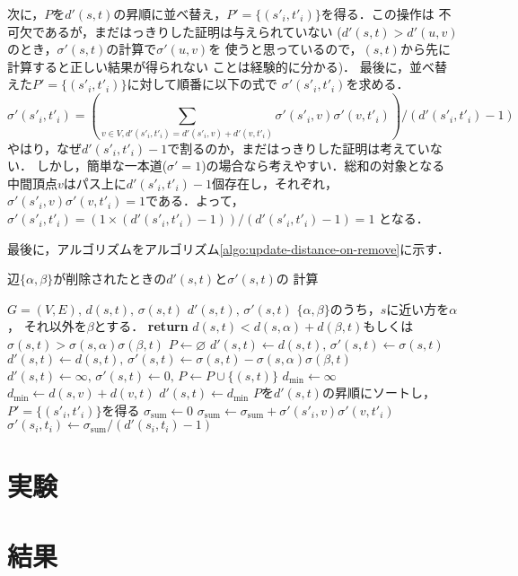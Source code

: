 次に，$P$を$d'(s,t)$の昇順に並べ替え，$P'=\{(s'_i,t'_i)\}$を得る．この操作は
不可欠であるが，まだはっきりした証明は与えられていない
($d'(s,t)>d'(u,v)$のとき，$\sigma'(s,t)$の計算で$\sigma'(u,v)$を
使うと思っているので，$(s,t)$から先に計算すると正しい結果が得られない
ことは経験的に分かる)．
最後に，並べ替えた$P'=\{(s'_i,t'_i)\}$に対して順番に以下の式で
$\sigma'(s'_i,t'_i)$を求める．
\[ \sigma'(s'_i,t'_i)=\left(\sum_{v\in V,d'(s'_i,t'_i)=d'(s'_i,v)+d'(v,t'_i)}
\sigma'(s'_i,v)\sigma'(v,t'_i)\right) / (d'(s'_i,t'_i)-1) \]
やはり，なぜ$d'(s'_i,t'_i)-1$で割るのか，まだはっきりした証明は考えていない．
しかし，簡単な一本道($\sigma'=1$)の場合なら考えやすい．総和の対象となる
中間頂点$v$はパス上に$d'(s'_i,t'_i)-1$個存在し，それぞれ，
$\sigma'(s'_i,v)\sigma'(v,t'_i)=1$である．よって，
$\sigma'(s'_i,t'_i)=(1\times (d'(s'_i,t'_i)-1))/(d'(s'_i,t'_i)-1)=1$
となる．

最後に，アルゴリズムをアルゴリズム\ref{algo:update-distance-on-remove}に示す．
\begin{algorithm}
  \caption{辺$\{\alpha,\beta\}$が削除されたときの$d'(s,t)$と$\sigma'(s,t)$の
  計算}\label{algo:update-distance-on-remove}
  \begin{algorithmic}[1]
    \Require $G=(V,E),\,d(s,t),\,\sigma(s,t)$
    \Ensure $d'(s,t),\,\sigma'(s,t)$
    \State $\{\alpha,\beta\}$のうち，$s$に近い方を$\alpha$，
    それ以外を$\beta$とする．
    \State \textbf{return} $d(s,t)<d(s,\alpha)+d(\beta,t)$もしくは
    $\sigma(s,t)>\sigma(s,\alpha)\sigma(\beta,t)$
    \EndProcedure
    \State $P\gets\varnothing$
    \State $d'(s,t)\gets d(s,t),\,\sigma'(s,t)\gets\sigma(s,t)$
    \State $d'(s,t)\gets d(s,t),\,\sigma'(s,t)\gets\sigma(s,t)
    -\sigma(s,\alpha)\sigma(\beta,t)$
    \Else{}
    \State $d'(s,t)\gets\infty,\,\sigma'(s,t)\gets0,\,P\gets P\cup\{(s,t)\}$
    \EndIf
    \EndFor
    \State $d_{\min}\gets\infty$
    \State $d_{\min}\gets d(s,v)+d(v,t)$
    \EndIf
    \EndIf
    \EndFor
    \State $d'(s,t)\gets d_{\min}$
    \EndFor
    \State $P$を$d'(s,t)$の昇順にソートし，$P'=\{(s'_i,t'_i)\}$を得る
    \State $\sigma_{\mathrm{sum}}\gets0$
    \State $\sigma_{\mathrm{sum}}\gets
    \sigma_{\mathrm{sum}}+\sigma'(s'_i,v)\sigma'(v,t'_i)$
    \EndIf
    \EndFor
    \State $\sigma'(s_i,t_i)\gets\sigma_{\mathrm{sum}}/(d'(s_i,t_i)-1)$
    \EndFor
    \EndProcedure
  \end{algorithmic}
\end{algorithm}

\section{実験}
\label{sect:exp-faster-min-max}

\section{結果}
\label{sect:result-faster-min-max}

